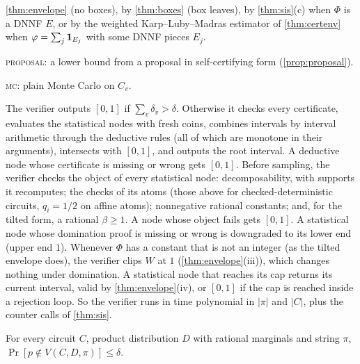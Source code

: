 \begin{definition}
\begin{description}[style=nextline,leftmargin=1.2em]
\cref{thm:envelope} (no boxes), by \cref{thm:boxes} (box leaves), by
\cref{thm:sis}(c) when $\Phi$ is a DNNF $E$, or by the weighted Karp--Luby--Madras
estimator of \cref{thm:certenv} when $\varphi=\sum_j\mathbf{1}_{E_j}$ with some DNNF
pieces $E_j$.
\par\textsc{proposal}: a lower bound from a proposal in self-certifying form
(\cref{prop:proposal}).
\par\textsc{mc}: plain Monte Carlo on $C_v$.
\end{description}
The verifier outputs $[0,1]$ if $\sum_v\delta_v>\delta$. Otherwise it checks every
certificate, evaluates the statistical nodes with fresh coins, combines intervals by
interval arithmetic through the deductive rules (all of which are monotone
in their arguments), intersects with $[0,1]$, and outputs the root interval.
A deductive node whose certificate is missing or wrong gets $[0,1]$. Before
sampling, the verifier checks the object of every statistical node: decomposability,
with supports it recomputes; the checks of its atoms (those above for
checked-deterministic circuits, $q_i=1/2$ on affine atoms); nonnegative rational
constants; and, for the tilted form, a rational $\beta\ge1$. A node whose object fails
gets $[0,1]$. A statistical node whose domination proof is missing or wrong is
downgraded to its lower end (upper end $1$). Whenever
$\Phi$ has a constant that is not an integer (as the tilted envelope does), the verifier
clips $W$ at $1$ (\cref{thm:envelope}(iii)), which changes nothing under domination. A
statistical node that reaches its cap returns its current interval, valid by
\cref{thm:envelope}(iv), or $[0,1]$ if the cap is reached inside a rejection loop. So
the verifier runs in time polynomial in $|\pi|$ and $|C|$, plus the counter calls of
\cref{thm:sis}.
\end{definition}

\begin{theorem}[soundness]\label{thm:pcis-sound}
For every circuit $C$, product distribution $D$ with rational marginals and
string $\pi$, $\Pr[p\notin V(C,D,\pi)]\le\delta$.
\end{theorem}

